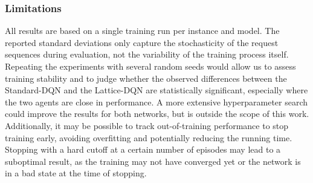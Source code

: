 \subsubsection{Limitations}
All results are based on a single training run per instance and model. The reported standard deviations only capture the stochasticity of the request sequences during evaluation, not the variability of the training process itself. Repeating the experiments with several random seeds would allow us to assess training stability and to judge whether the observed differences between the Standard-DQN and the Lattice-DQN are statistically significant, especially where the two agents are close in performance.
A more extensive hyperparameter search could improve the results for both networks, but is outside the scope of this work.\\
Additionally, it may be possible to track out-of-training performance to stop training early, avoiding
overfitting and potentially reducing the running time. Stopping with a hard cutoff at a certain number of episodes
may lead to a suboptimal result, as the training may not have converged yet or the network is in a bad state at the time of stopping.
